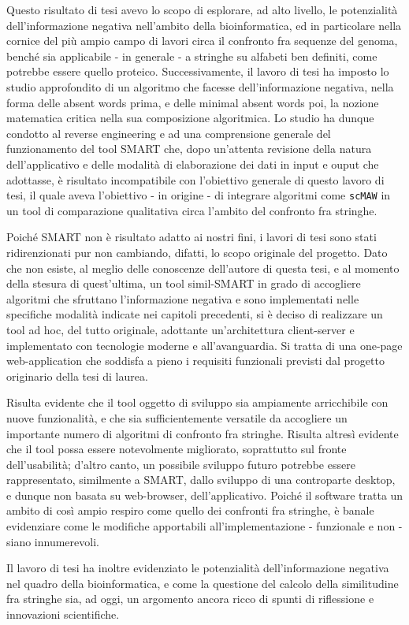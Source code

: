 Questo risultato di tesi avevo lo scopo di esplorare, ad alto livello, le potenzialità dell'informazione negativa nell'ambito della bioinformatica, ed in particolare nella cornice del più ampio campo di lavori circa il confronto fra sequenze del genoma, benché sia applicabile - in generale - a stringhe su alfabeti ben definiti, come potrebbe essere quello proteico. Successivamente, il lavoro di tesi ha imposto lo studio approfondito di un algoritmo che facesse dell'informazione negativa, nella forma delle absent words prima, e delle minimal absent words poi, la nozione matematica critica nella sua composizione algoritmica. Lo studio ha dunque condotto al reverse engineering e ad una comprensione generale del funzionamento del tool SMART che, dopo un'attenta revisione della natura dell'applicativo e delle modalità di elaborazione dei dati in input e ouput che adottasse, è risultato incompatibile con l'obiettivo generale di questo lavoro di tesi, il quale aveva l'obiettivo - in origine - di integrare algoritmi come \verb|scMAW| in un tool di comparazione qualitativa circa l'ambito del confronto fra stringhe. 

\vspace{3mm}

Poiché SMART non è risultato adatto ai nostri fini, i lavori di tesi sono stati ridirenzionati pur non cambiando, difatti, lo scopo originale del progetto. Dato che non esiste, al meglio delle conoscenze dell'autore di questa tesi,  e al momento della stesura di quest'ultima, un tool simil-SMART in grado di accogliere algoritmi che sfruttano l'informazione negativa e sono implementati nelle specifiche modalità indicate nei capitoli precedenti, si è deciso di realizzare un tool ad hoc, del tutto originale, adottante un'architettura client-server e implementato con tecnologie moderne e all'avanguardia. Si tratta di una one-page web-application che soddisfa a pieno i requisiti funzionali previsti dal progetto originario della tesi di laurea.

\vspace{3mm}

Risulta evidente che il tool oggetto di sviluppo sia ampiamente arricchibile con nuove funzionalità, e che sia sufficientemente versatile da accogliere un importante numero di algoritmi di confronto fra stringhe. Risulta altresì evidente che il tool possa essere notevolmente migliorato, soprattutto sul fronte dell'usabilità; d'altro canto, un possibile sviluppo futuro potrebbe essere rappresentato, similmente a SMART, dallo sviluppo di una controparte desktop, e dunque non basata su web-browser, dell'applicativo. Poiché il software tratta un ambito di così ampio respiro come quello dei confronti fra stringhe, è banale evidenziare come le modifiche apportabili all'implementazione - funzionale e non - siano innumerevoli.

\vspace{3mm}

Il lavoro di tesi ha inoltre evidenziato le potenzialità dell'informazione negativa nel quadro della bioinformatica, e come la questione del calcolo della similitudine fra stringhe sia, ad oggi, un argomento ancora ricco di spunti di riflessione e innovazioni scientifiche.
